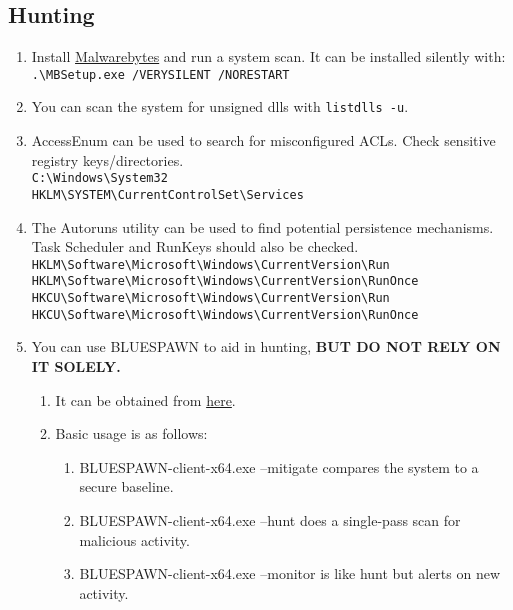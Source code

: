 \documentclass[12pt,letterpaper]{article}
\def\code#1{\textcolor{iris}{\texttt{#1}}}
\def\bf#1{\textbf{#1}}
\begin{document}
\subsection{Hunting}

\begin{enumerate}
	\item Install \href{https://downloads.malwarebytes.com/file/mb-windows}{Malwarebytes} and run a system scan. It can be installed silently with: \\
		\code{.\textbackslash{}MBSetup.exe /VERYSILENT /NORESTART}
	\item You can scan the system for unsigned dlls with \code{listdlls -u}.
	\item AccessEnum can be used to search for misconfigured ACLs. Check sensitive registry keys/directories. \\
		\code{C:\textbackslash{}Windows\textbackslash{}System32} \\
		\code{HKLM\textbackslash{}SYSTEM\textbackslash{}CurrentControlSet\textbackslash{}Services}
	\item The Autoruns utility can be used to find potential persistence mechanisms. Task Scheduler and RunKeys should also be checked. \\
		\code{HKLM\textbackslash{}Software\textbackslash{}Microsoft\textbackslash{}Windows\textbackslash{}CurrentVersion\textbackslash{}Run} \\
		\code{HKLM\textbackslash{}Software\textbackslash{}Microsoft\textbackslash{}Windows\textbackslash{}CurrentVersion\textbackslash{}RunOnce} \\
		\code{HKCU\textbackslash{}Software\textbackslash{}Microsoft\textbackslash{}Windows\textbackslash{}CurrentVersion\textbackslash{}Run} \\
		\code{HKCU\textbackslash{}Software\textbackslash{}Microsoft\textbackslash{}Windows\textbackslash{}CurrentVersion\textbackslash{}RunOnce}
	\item You can use BLUESPAWN to aid in hunting, \bf{BUT DO NOT RELY ON IT SOLELY.}
	\begin{enumerate}
		\item It can be obtained from \href{https://github.com/ION28/BLUESPAWN/releases/download/v0.5.1-alpha/BLUESPAWN-client-x64.exe}{here}.
		\item Basic usage is as follows:
		\begin{enumerate}
			\item BLUESPAWN-client-x64.exe --mitigate compares the system to a secure baseline.
			\item BLUESPAWN-client-x64.exe --hunt does a single-pass scan for malicious activity.
			\item BLUESPAWN-client-x64.exe --monitor is like hunt but alerts on new activity.
		\end{enumerate}
	\end{enumerate}
\end{enumerate}
\end{document}
